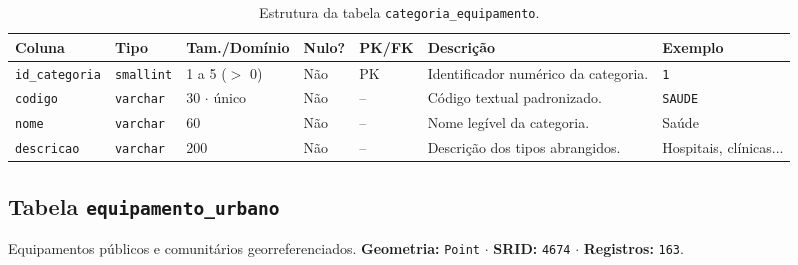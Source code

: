 \documentclass[
    12pt,
    oneside,
    a4paper,
    chapter=TITLE,
    section=TITLE,
    brazil
]{abntex2}
\begin{document}
\begin{table}[H]
\centering
\caption{Estrutura da tabela \texttt{categoria\_equipamento}.}
\label{tab:categoria}
\scriptsize
\begin{tabularx}{\textwidth}{p{2.3cm} p{1.6cm} p{2.2cm} p{0.9cm} p{0.9cm} X p{2.3cm}}
\toprule
\textbf{Coluna} & \textbf{Tipo} & \textbf{Tam./Domínio} & \textbf{Nulo?} & \textbf{PK/FK} & \textbf{Descrição} & \textbf{Exemplo} \\
\midrule
\texttt{id\_categoria} & \texttt{smallint} & 1 a 5 ($>$ 0) & Não & PK & Identificador numérico da categoria. & \texttt{1} \\
\texttt{codigo} & \texttt{varchar} & 30 $\cdot$ único & Não & -- & Código textual padronizado. & \texttt{SAUDE} \\
\texttt{nome} & \texttt{varchar} & 60 & Não & -- & Nome legível da categoria. & Saúde \\
\texttt{descricao} & \texttt{varchar} & 200 & Não & -- & Descrição dos tipos abrangidos. & Hospitais, clínicas... \\
\bottomrule
\end{tabularx}
\end{table}

\subsection{Tabela \texttt{equipamento\_urbano}}
Equipamentos públicos e comunitários georreferenciados. \textbf{Geometria:} \texttt{Point} $\cdot$ \textbf{SRID:} \texttt{4674} $\cdot$ \textbf{Registros:} \texttt{163}.
\end{document}
